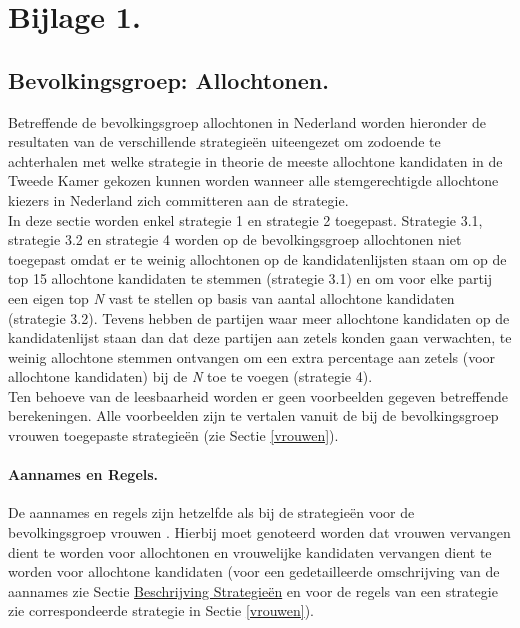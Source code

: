 \newpage
\section{Bijlage 1.}
\label{b1}


\subsection{Bevolkingsgroep: Allochtonen.}
\label{allochtonen}

Betreffende de bevolkingsgroep allochtonen in Nederland worden hieronder de resultaten van de verschillende strategie\"{e}n uiteengezet om zodoende te achterhalen met welke strategie in theorie de meeste allochtone kandidaten in de Tweede Kamer gekozen kunnen worden wanneer alle stemgerechtigde allochtone kiezers in Nederland zich committeren aan de strategie.\\
\indent In deze sectie worden enkel strategie 1 en strategie 2 toegepast. Strategie 3.1, strategie 3.2 en strategie 4 worden op de bevolkingsgroep allochtonen niet toegepast omdat er te weinig allochtonen op de kandidatenlijsten staan om op de top 15 allochtone kandidaten te stemmen (strategie 3.1) en om voor elke partij een eigen top \textit{N} vast te stellen op basis van aantal allochtone kandidaten (strategie 3.2). Tevens hebben de partijen waar meer allochtone kandidaten op de kandidatenlijst staan dan dat deze partijen aan zetels konden gaan verwachten, te weinig allochtone stemmen ontvangen om een extra percentage aan zetels (voor allochtone kandidaten) bij de \textit{N} toe te voegen (strategie 4).\\
\indent Ten behoeve van de leesbaarheid worden er geen voorbeelden gegeven betreffende berekeningen. Alle voorbeelden zijn te vertalen vanuit de bij de bevolkingsgroep vrouwen toegepaste strategie\"{e}n (zie Sectie \ref{vrouwen}). 

\paragraph{Aannames en Regels.}
De aannames en regels zijn hetzelfde als bij de strategie\"{e}n voor de bevolkingsgroep vrouwen . Hierbij moet genoteerd worden dat vrouwen vervangen dient te worden voor allochtonen en vrouwelijke kandidaten vervangen dient te worden voor allochtone kandidaten (voor een gedetailleerde omschrijving van de aannames zie Sectie \hyperref[besS]{Beschrijving Strategie\"{e}n} en voor de regels van een strategie zie correspondeerde strategie in Sectie \ref{vrouwen}).

